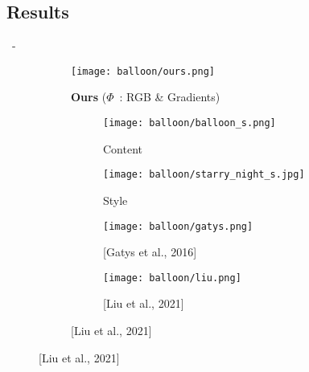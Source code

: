 \documentclass[aspectratio=169, 22pt]{beamer}
\begin{document}
\subsection{Results}
\begin{frame}{\secname~- \subsecname}
  \begin{figure}
    \begin{subfigure}{0.47\linewidth}
      \texttt{[image: balloon/ours.png]}
      \caption{\textbf{Ours} ($\Phi$ : RGB \& Gradients)}
    \end{subfigure}
    \begin{subfigure}{0.45\linewidth}
      \begin{subfigure}{0.45\linewidth}
        \texttt{[image: balloon/balloon\_s.png]}
        \caption{Content}
      \end{subfigure}
      \begin{subfigure}{0.45\linewidth}
        \texttt{[image: balloon/starry\_night\_s.jpg]}
        \caption{Style}
      \end{subfigure}

      \begin{subfigure}{0.45\linewidth}
        \texttt{[image: balloon/gatys.png]}
        \caption{\scriptsize [Gatys et al., 2016]}
      \end{subfigure}
      \begin{subfigure}{0.45\linewidth}
        \texttt{[image: balloon/liu.png]}
        \caption{[Liu et al., 2021]}
      \end{subfigure}
    \end{subfigure}
  \end{figure}
\end{frame}
\end{document}
